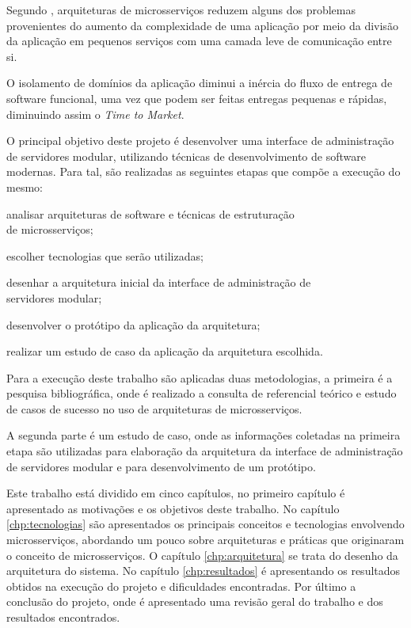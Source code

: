 Segundo , arquiteturas de microsserviços reduzem
alguns dos problemas provenientes do aumento da complexidade de uma aplicação
por meio da divisão da aplicação em pequenos serviços com uma camada leve
de comunicação entre si.

O isolamento de domínios da aplicação diminui a inércia do fluxo de entrega
de software funcional, uma vez que podem ser feitas entregas pequenas e
rápidas, diminuindo assim o \emph{Time to Market}.

O principal objetivo deste projeto é desenvolver uma interface de
administração de servidores modular, utilizando técnicas de desenvolvimento
de software modernas. Para tal, são realizadas as seguintes etapas que compõe
a execução do mesmo:

\begin{alineas}
  \item analisar arquiteturas de software e técnicas de estruturação \\
    de microsserviços;
  \item escolher tecnologias que serão utilizadas;
  \item desenhar a arquitetura inicial da interface de administração de \\
    servidores modular;
  \item desenvolver o protótipo da aplicação da arquitetura;
  \item realizar um estudo de caso da aplicação da arquitetura escolhida.
\end{alineas}

Para a execução deste trabalho são aplicadas duas metodologias, a primeira
é a pesquisa bibliográfica, onde é realizado a consulta de referencial
teórico e estudo de casos de sucesso no uso de arquiteturas de microsserviços.

A segunda parte é um estudo de caso, onde as informações coletadas
na primeira etapa são utilizadas para elaboração da arquitetura da interface
de administração de servidores modular e para desenvolvimento de um protótipo.

Este trabalho está dividido em cinco capítulos, no primeiro capítulo é
apresentado as motivações e os objetivos deste trabalho. No capítulo
\ref{chp:tecnologias} são apresentados os principais conceitos e tecnologias
envolvendo microsserviços, abordando um pouco sobre arquiteturas
e práticas que originaram o conceito de microsserviços. O capítulo
\ref{chp:arquitetura} se trata do desenho da arquitetura do sistema. No
capítulo \ref{chp:resultados} é apresentando os resultados obtidos na execução
do projeto e dificuldades encontradas. Por último a conclusão do projeto,
onde é apresentado uma revisão geral do trabalho e dos resultados encontrados.
